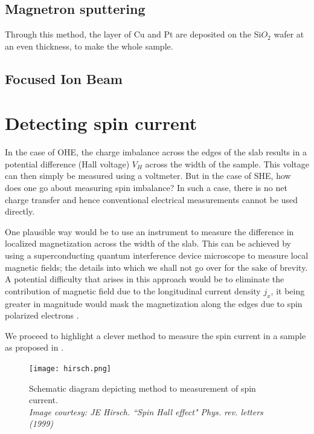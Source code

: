 \subsection{Magnetron sputtering}

Through this method, the layer of Cu and Pt are deposited on the Si$O_2$ wafer at an even thickness, to make the whole sample.

\subsection{Focused Ion Beam}




\section{Detecting spin current}

In the case of OHE, the charge imbalance across the edges of the slab results in a potential difference (Hall voltage) \( V_H \) across the width of the sample.
This voltage can then simply be measured using a voltmeter.
But in the case of SHE, how does one go about measuring spin imbalance?
In such a case, there is no net charge transfer and hence conventional electrical measurements cannot be used directly.

One plausible way would be to use an instrument to measure the difference in localized magnetization across the width of the slab.
This can be achieved by using a superconducting quantum interference device microscope \cite{black1993magnetic} to measure local magnetic fields; the details into which we shall not go over for the sake of brevity.
A potential difficulty that arises in this approach would be to eliminate the contribution of magnetic field due to the longitudinal current density \( j_x \), it being greater in magnitude would mask the magnetization along the edges due to spin polarized electrons \cite{hirsch1999spin}.

We proceed to highlight a clever method to measure the spin current in a sample as proposed in \cite{hirsch1999spin}.

\begin{figure}[h!]
    \texttt{[image: hirsch.png]}
    \caption{Schematic diagram depicting method to measurement of spin current.\\ \vspace{0.2cm} \textit{Image courtesy: JE Hirsch. ``Spin Hall effect" Phys. rev. letters (1999)}}
    \label{fig:hirsch-measure}
\end{figure}

